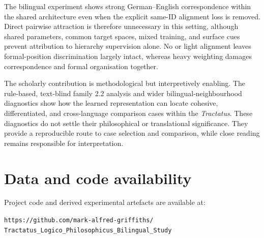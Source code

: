 \documentclass[webpdf,modern,medium,namedate]{oup-authoring-template}
\begin{document}
The bilingual experiment shows strong German--English correspondence within the shared architecture even when the explicit same-ID alignment loss is removed. Direct pairwise attraction is therefore unnecessary in this setting, although shared parameters, common target spaces, mixed training, and surface cues prevent attribution to hierarchy supervision alone. No or light alignment leaves formal-position discrimination largely intact, whereas heavy weighting damages correspondence and formal organisation together.

The scholarly contribution is methodological but interpretively enabling. The rule-based, text-blind family 2.2 analysis and wider bilingual-neighbourhood diagnostics show how the learned representation can locate cohesive, differentiated, and cross-language comparison cases within the \emph{Tractatus}. These diagnostics do not settle their philosophical or translational significance. They provide a reproducible route to case selection and comparison, while close reading remains responsible for interpretation.

\section*{Data and code availability}
Project code and derived experimental artefacts are available at:
\begin{flushleft}
\texttt{https://github.com/mark-alfred-griffiths/}\allowbreak
\texttt{Tractatus\_Logico\_Philosophicus\_Bilingual\_Study}
\end{flushleft}


{ 

\par}
\end{document}
